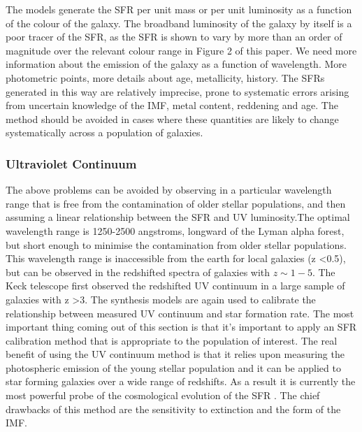 \documentclass{literature}
\begin{document}
The models generate the SFR per unit mass or per unit luminosity as a function of the colour of the galaxy. The broadband luminosity of the galaxy by itself is a poor tracer of the SFR, as the SFR is shown to vary by more than an order of magnitude over the relevant colour range in Figure 2 of this paper. We need more information about the emission of the galaxy as a function of wavelength. More photometric points, more details about age, metallicity, history. The SFRs generated in this way are relatively imprecise, prone to systematic errors arising from uncertain knowledge of the IMF, metal content, reddening and age. The method should be avoided in cases where these quantities are likely to change systematically across a population of galaxies. \\ 
\subsubsection{Ultraviolet Continuum}   
The above problems can be avoided by observing in a particular wavelength range that is free from the contamination of older stellar populations, and then assuming a linear relationship between the SFR and UV luminosity.The optimal wavelength range is 1250-2500 angstroms, longward of the Lyman alpha forest, but short enough to minimise the contamination from older stellar populations. This wavelength range is inaccessible from the earth for local galaxies (z   \textless 0.5), but can be observed in the redshifted spectra of galaxies with $z \sim 1-5$. The Keck telescope first observed the redshifted UV continuum in a large sample of galaxies with z \textgreater 3. The synthesis models are again used to calibrate the relationship between measured UV continuum and star formation rate. The most important thing coming out of this section is that it's important to apply an SFR calibration method that is appropriate to the population of interest. The real benefit of using the UV continuum method is that it relies upon measuring the photospheric emission of the young stellar population and it can be applied to star forming galaxies over a wide range of redshifts. As a result it is currently the most powerful probe of the cosmological evolution of the SFR \citep{Madau_1996}. The chief drawbacks of this method are the sensitivity to extinction and the form of the IMF.
\end{document}
